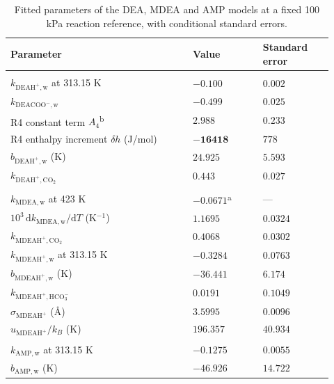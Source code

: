 \begin{table}[pos=!htbp]\small\setlength{\tabcolsep}{2pt}\caption{Fitted parameters of the DEA, MDEA and AMP models at a fixed 100 kPa reaction reference, with conditional standard errors.}\label{tab:transfer-fitted}
\begin{tabular}{@{}>{\raggedright\arraybackslash}p{0.52\linewidth}>{\raggedright\arraybackslash}p{0.2\linewidth}>{\raggedright\arraybackslash}p{0.2\linewidth}@{}}
\toprule Parameter & Value & Standard error \\ \midrule
\addlinespace\multicolumn{3}{@{}l}{\textit{DEA}} \\*
$k_{\mathrm{DEAH^+,w}}$ at 313.15 K & $\boldsymbol{-0.100}$ & $0.002$ \\
$k_{\mathrm{DEACOO^-,w}}$ & $\boldsymbol{-0.499}$ & $0.025$ \\
R4 constant term $A_4$\textsuperscript{b} & $\boldsymbol{2.988}$ & $0.233$ \\
R4 enthalpy increment $\delta h$ (J/mol) & $\boldsymbol{-16418}$ & $778$ \\
$b_{\mathrm{DEAH^+,w}}$ (K) & $\boldsymbol{24.925}$ & $5.593$ \\
$k_{\mathrm{DEAH^+,CO_2}}$ & $\boldsymbol{0.443}$ & $0.027$ \\
\addlinespace\multicolumn{3}{@{}l}{\textit{MDEA}} \\*
$k_{\mathrm{MDEA,w}}$ at 423 K & $\boldsymbol{-0.0671}$\textsuperscript{a} & --- \\
$10^{3}\,\mathrm{d}k_{\mathrm{MDEA,w}}/\mathrm{d}T$ (K$^{-1}$) & $\boldsymbol{1.1695}$ & $0.0324$ \\
$k_{\mathrm{MDEAH^+,CO_2}}$ & $\boldsymbol{0.4068}$ & $0.0302$ \\
$k_{\mathrm{MDEAH^+,w}}$ at 313.15 K & $\boldsymbol{-0.3284}$ & $0.0763$ \\
$b_{\mathrm{MDEAH^+,w}}$ (K) & $\boldsymbol{-36.441}$ & $6.174$ \\
$k_{\mathrm{MDEAH^+,HCO_3^-}}$ & $\boldsymbol{0.0191}$ & $0.1049$ \\
$\sigma_{\mathrm{MDEAH^+}}$ (\AA) & $\boldsymbol{3.5995}$ & $0.0096$ \\
$u_{\mathrm{MDEAH^+}}/k_B$ (K) & $\boldsymbol{196.357}$ & $40.934$ \\
\addlinespace\multicolumn{3}{@{}l}{\textit{AMP}} \\*
$k_{\mathrm{AMP,w}}$ at 313.15 K & $\boldsymbol{-0.1275}$ & $0.0055$ \\
$b_{\mathrm{AMP,w}}$ (K) & $\boldsymbol{-46.926}$ & $14.722$ \\

\end{tabular}
\end{table}
